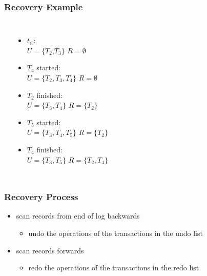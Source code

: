 \documentclass[dvipsnames]{beamer}
\theoremstyle{plain}
\begin{document}
\begin{frame}
  \frametitle{Recovery Example}

  \begin{example}
    \begin{columns}[t]
      \begin{center}\end{center}

      \pause
      \begin{itemize}
        \item $t_C$:\\
          $U=\{T_2$,$T_3\}$
          $R=\emptyset$

        \pause
        \item $T_4$ started:\\
          $U=\{T_2,T_3,T_4\}$
          $R=\emptyset$

        \pause
        \item $T_2$ finished:\\
          $U=\{T_3,T_4\}$
          $R=\{T_2\}$

        \pause
        \item $T_5$ started:\\
          $U=\{T_3,T_4,T_5\}$
          $R=\{T_2\}$

        \pause
        \item $T_4$ finished:\\
          $U=\{T_3,T_5\}$
          $R=\{T_2,T_4\}$
      \end{itemize}
    \end{columns}
  \end{example}
\end{frame}

\begin{frame}
  \frametitle{Recovery Process}

  \begin{itemize}
    \item scan records from end of log backwards
    \begin{itemize}
      \item undo the operations of the transactions in the undo list
    \end{itemize}

    \pause
    \item scan records forwards
    \begin{itemize}
      \item redo the operations of the transactions in the redo list
    \end{itemize}
  \end{itemize}
\end{frame}
\end{document}
